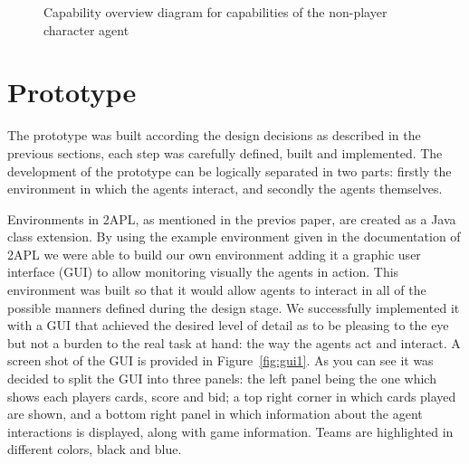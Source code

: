 \documentclass[a4paper]{article}
\begin{document}
\begin{figure}[htp]
  \label{fig:non-player-cap}
  \caption{Capability overview diagram for capabilities of the non-player character agent}
\end{figure}

\section{Prototype}\label{sec:proto} 

The prototype was built according the design decisions as described in the previous sections, each step was carefully defined, built and implemented. %
The development of the prototype can be logically separated in two parts: firstly the environment in which the agents interact, and secondly the agents themselves.

Environments in 2APL, as mentioned in the previos paper, are created as a Java class extension. By using the example environment given in the documentation of 2APL we were able to build our own environment adding it a graphic user interface (GUI) to allow monitoring visually the agents in action. This environment was built so that it would allow agents to interact in all of the possible manners defined during the design stage. We successfully implemented it with a GUI that achieved the desired level of detail as to be pleasing to the eye but not a burden to the real task at hand: the way the agents act and interact. A screen shot of the GUI is provided in Figure~\ref{fig:gui1}. As you can see it was decided to split the GUI into three panels: the left panel being the one which shows each players cards, score and bid; a top right corner in which cards played are shown, and a bottom right panel in which information about the agent interactions is displayed, along with game information. Teams are highlighted in different colors, black and blue.
\end{document}
